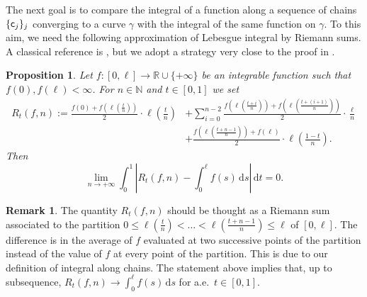 \documentclass[12pt]{amsart}
\newcommand{\N}{\mathbb{N}}
\renewcommand{\d}{{\mathrm d}}
\newtheorem{proposition}[theorem]{Proposition}
\theoremstyle{definition}
\newtheorem{remark}[theorem]{Remark}
\newcommand{\sfc}{{\sf c}}
\begin{document}
The next goal is to compare the integral of a function along a sequence of chains $\{\sfc_j\}_j$ converging to a curve $\gamma$ with the integral of the same function on $\gamma$. To this aim, we need the following approximation of Lebesgue integral by Riemann sums. A classical reference is \cite[Pag.\ 63]{Doob90}, but we adopt a strategy very close to the proof in \cite[Prop.\ 3.18]{CaputoGigliPasqualetto2021}.
\begin{proposition}
\label{prop:doob_approximation}
    Let $f \colon [0,\ell] \to \mathbb{R} \cup \{+\infty\}$ be an integrable function such that $f(0),f(\ell) < \infty$. For $n \in \N$ and $t\in [0,1]$ we set
    \begin{equation}
        \begin{aligned}
            R_t(f,n) := \frac{f(0) + f\left(\ell\left(\frac{t}{n}\right)\right)}{2} \cdot \ell\left(\frac{t}{n}\right) &+ \sum_{i=0}^{n-2}\frac{f\left(\ell\left(\frac{t+i}{n}\right)\right)+f\left(\ell\left(\frac{t+(i+1)}{n}\right)\right)}{2}\cdot\frac{\ell}{n} \\
            &+ \frac{f\left(\ell \left(\frac{t+n-1}{n}\right)\right) + f(\ell)}{2} \cdot \ell\left(\frac{1-t}{n}\right).
        \end{aligned}
    \end{equation}
    Then
    $$\lim_{n\to +\infty} \int_0^1 \left\vert R_t(f,n) - \int_0^\ell f(s) \,\d s \right\vert\,\d t = 0.$$
\end{proposition}
%
\begin{remark}
\label{rmk:approximation_integral_a.e.t}
    The quantity $R_t(f,n)$ should be thought as a Riemann sum associated to the partition $0 \le \ell\left(\frac{t}{n}\right) < \ldots < \ell \left( \frac{t+n-1}{n} \right) \le \ell$ of $[0,\ell]$. The difference is in the average of $f$ evaluated at two successive points of the partition instead of the value of $f$ at every point of the partition. This is due to our definition of integral along chains. 
    The statement above implies that, up to subsequence, $R_t(f,n) \to \int_0^\ell f(s)\,\d s$ for a.e.\ $t \in [0,1]$.
\end{remark}
%
\end{document}
